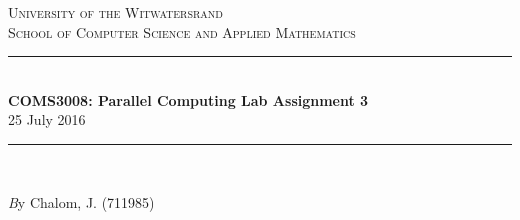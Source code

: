 \documentclass[11pt]{article}
\begin{document}
\begin{page}

\newcommand{\HRule}{\rule{\linewidth}{0.3mm}} %
\renewcommand\section{\@startsection{section}{1}{\z@}%
                                  {-3.5ex \@plus -1ex \@minus -.2ex}%
                                  {2.3ex \@plus.2ex}%
                                  {\normalfont\large\bfseries}}
\setlength{\parindent}{0pt}

\center %
 

\textsc{\LARGE University of the Witwatersrand}\\[1.5cm] %
\textsc{\Large School of Computer Science and Applied Mathematics}\\[0.5cm] %


\HRule \\[0.4cm]
{ \huge \bfseries COMS3008: Parallel Computing Lab Assignment 3}\\[0.4cm] %
  \large 25 July 2016
\HRule \\[1.5cm]
 
\begin{minipage}{1\textwidth}
  \Large \emph By Chalom, J. (711985)\\
\end{minipage}


\vfill %

\end{page}
\end{document}
